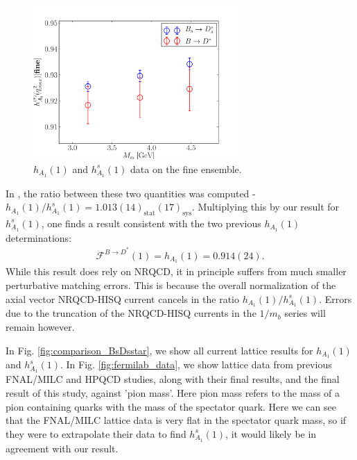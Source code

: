\begin{figure}[htb!]
  \begin{center}
  \hspace{-10pt}
  \includegraphics[width=0.7\textwidth]{images/BsDsstar/BD_BsDs.pdf}
  \caption{$h_{A_1}(1)$ and $h_{A_1}^s(1)$ data on the fine ensemble.\label{fig:BDstar_BsDsstar}}
  \end{center}
\end{figure}

In \cite{Harrison:2017fmw}, the ratio between these two quantities was computed - $h_{A_1}(1) / h^s_{A_1}(1) = 1.013(14)_{\text{stat}}(17)_{\text{sys}}$. Multiplying this by our result for $h^s_{A_1}(1)$, one finds a result consistent with the two previous $h_{A_1}(1)$ determinations:
\begin{align}
  \mathcal{F}^{B\to D^*}(1) = h_{A_1}(1) = 0.914(24).
  \label{eq:hA1_us_nrqcd}
\end{align}
While this result does rely on NRQCD, it in principle suffers from much smaller perturbative matching errors. This is because the overall normalization of the axial vector NRQCD-HISQ current cancels in the ratio $h_{A_1}(1) / h^s_{A_1}(1)$. Errors due to the truncation of the NRQCD-HISQ currents in the $1/m_b$ series will remain however.

In Fig. \ref{fig:comparison_BsDsstar}, we show all current lattice results for $h_{A_1}(1)$ and $h_{A_1}^s(1)$. In Fig. \ref{fig:fermilab_data}, we show lattice data from previous FNAL/MILC and HPQCD studies, along with their final results, and the final result of this study, against 'pion mass'. Here pion mass refers to the mass of a pion containing quarks with the mass of the spectator quark. Here we can see that the FNAL/MILC lattice data is very flat in the spectator quark mass, so if they were to extrapolate their data to find $h^s_{A_1}(1)$, it would likely be in agreement with our result.

